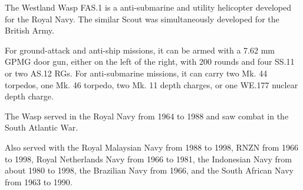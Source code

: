 

The Westland Wasp FAS.1 is a anti-submarine and utility helicopter developed for the Royal Navy. The similar Scout was simultaneously developed for the British Army.

For ground-attack and anti-ship missions, it can be armed with a 7.62 mm GPMG door gun, either on the left of the right, with 200 rounds and four SS.11 or two AS.12 RGs. For anti-submarine missions, it can carry two Mk. 44 torpedos, one Mk. 46 torpedo, two Mk. 11 depth charges, or one WE.177 nuclear depth charge.

The Wasp served in the Royal Navy from 1964 to 1988 and saw combat in the South Atlantic War.

Also served with the Royal Malaysian Navy from 1988 to 1998, RNZN from 1966 to 1998, Royal Netherlands Navy from 1966 to 1981, the Indonesian Navy from about 1980 to 1998, the Brazilian Navy from 1966, and the South African Navy from 1963 to 1990.
